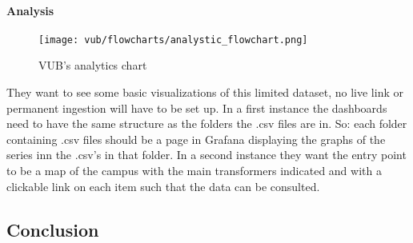 \paragraph{Analysis}
\begin{figure}[ht]
    \texttt{[image: vub/flowcharts/analystic\_flowchart.png]}
    \caption{\ac{VUB}'s analytics chart}
    \label{fig:vub_anal_chart}
\end{figure}
They want to see some basic visualizations of this limited dataset, no live link or permanent ingestion will have to be set up.
In a first instance the dashboards need to have the same structure as the folders the .csv files are in.
So: each folder containing .csv files should be a page in Grafana displaying the graphs of the series inn the .csv's in that folder.
In a second instance they want the entry point to be a map of the campus with the main transformers indicated and with a clickable link on each item such that the data can be consulted. 


\subsection{Conclusion}
